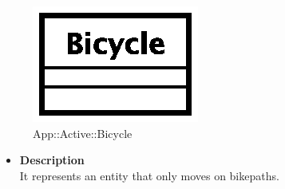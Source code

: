 \begin{figure}[h]
\centering
\includegraphics[scale=0.6,keepaspectratio]{images/solution/bicycle.eps}
\caption{App::Active::Bicycle}
\label{fig:sd-app-bicycle}
\end{figure}
\begin{itemize}
  \item \textbf{Description} \\
It represents an entity that only moves on bikepaths.
\end{itemize} 
